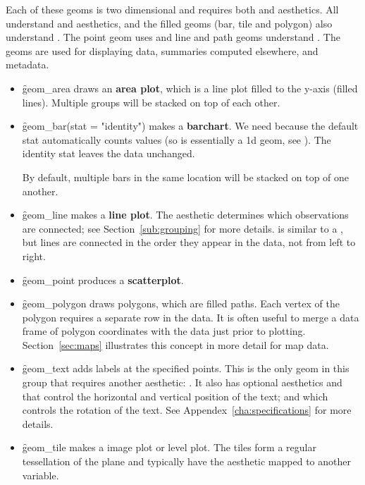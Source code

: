 Each of these geoms is two dimensional and requires both  and  aesthetics.  All understand  and  aesthetics, and the filled geoms (bar, tile and polygon) also understand .  The point geom uses  and line and path geoms understand . The geoms are used for displaying data, summaries computed elsewhere, and metadata.

\begin{itemize}
  \item \f{geom_area} draws an \textbf{area plot}, which is a line plot filled to the y-axis (filled lines).  Multiple groups will be stacked on top of each other.  
  
  \item \f{geom_bar(stat = "identity")} makes a \textbf{barchart}. We need  because the default stat automatically counts values (so is essentially a 1d geom, see ). The identity stat leaves the data unchanged.  
  
  By default, multiple bars in the same location will be stacked on top of one another.
  
  \item \f{geom_line} makes a \textbf{line plot}.  The  aesthetic determines which observations are connected; see Section~\ref{sub:grouping} for more details.  is similar to a , but lines are connected in the order they appear in the data, not from left to right.    
  
  \item \f{geom_point} produces a \textbf{scatterplot}. 
  
  \item \f{geom_polygon} draws polygons, which are filled paths.  Each vertex of the polygon requires a separate row in the data.  It is often useful to merge a data frame of polygon coordinates with the data just prior to plotting.  Section~\ref{sec:maps} illustrates this concept in more detail for map data. 
  
  \item \f{geom_text} adds labels at the specified points.  This is the only geom in this group that requires another aesthetic: .  It also has optional aesthetics  and  that control the horizontal and vertical position of the text; and  which controls the rotation of the text.  See Appendex~\ref{cha:specifications} for more details.  
  
  \item \f{geom_tile} makes a image plot or level plot.  The tiles form a regular tessellation of the plane and typically have the  aesthetic mapped to another variable.   

\end{itemize}

